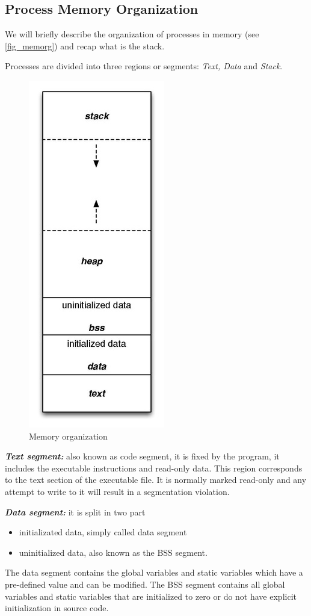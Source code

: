\documentclass[10pt,twocolumn]{article}
\begin{document}
\subsection{Process Memory Organization} 
We will briefly describe the
organization of processes in memory (see \autoref{fig_memorg}) and recap what is the stack. 

Processes are divided into three regions or segments: \textit{Text, Data} and
\textit{Stack}.

\begin{figure}[h]
  \centering
  \includegraphics[scale=.85]{./graphics/memory_organization.jpg}
  \caption{Memory organization}
  \label{fig_memorg}
\end{figure}

\textbf{\textit{Text segment:}} also known as code segment, it is fixed by the program, it
includes the executable instructions and read-only data. This region
corresponds to the text section of the executable file. It is normally
marked read-only and any attempt to write to it will result in a segmentation
violation.

\textbf{\textit{Data segment:}} it is split in two part
\begin{itemize}
\item initializated data, simply called data segment
\item uninitialized data, also known as the BSS segment.
\end{itemize}
    The data segment contains the global variables and static variables
which have a pre-defined value and can be modified. The BSS segment contains
all global variables and static variables that are initialized to zero or do
not have explicit initialization in source code.
\end{document}
